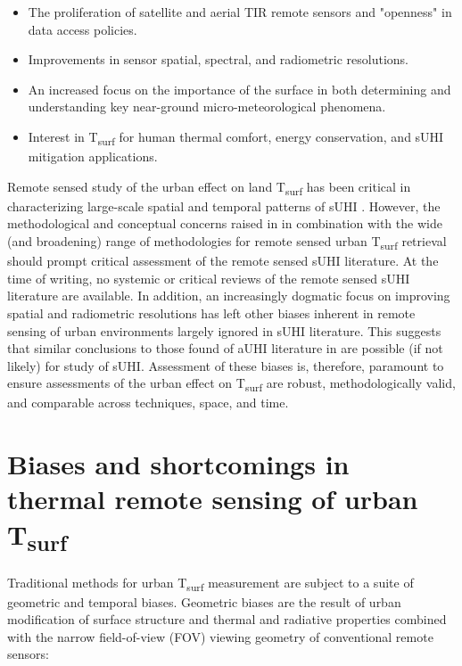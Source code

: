 \begin{bibunit}
\begin{itemize}
	\item The proliferation of satellite and aerial TIR remote sensors and "openness" in data access policies.
	\item Improvements in sensor spatial, spectral, and radiometric resolutions. 
	\item An increased focus on the importance of the surface in both determining and understanding key near-ground micro-meteorological phenomena.
	\item Interest in T\textsubscript{surf} for human thermal comfort, energy conservation, and sUHI mitigation applications. 
\end{itemize}

Remote sensed study of the urban effect on land T\textsubscript{surf} has been critical in characterizing large-scale spatial and temporal patterns of sUHI \citep{Peng2012, Streutker2003, Imhoff2010}. However, the methodological and conceptual concerns raised in \citet{Stewart2011} in combination with the wide (and broadening) range of methodologies for remote sensed urban T\textsubscript{surf} retrieval should prompt critical assessment of the remote sensed sUHI literature. At the time of writing, no systemic or critical reviews of the remote sensed sUHI literature are available. In addition, an increasingly dogmatic focus on improving spatial and radiometric resolutions has left other biases inherent in remote sensing of urban environments largely ignored in sUHI literature. This suggests that similar conclusions to those found of aUHI literature in \citet{Stewart2011} are possible (if not likely) for study of sUHI. Assessment of these biases is, therefore, paramount to ensure assessments of the urban effect on T\textsubscript{surf} are robust, methodologically valid, and comparable across techniques, space, and time.

\section{Biases and shortcomings in thermal remote sensing of urban T\textsubscript{surf}}

Traditional methods for urban T\textsubscript{surf} measurement are subject to a suite of geometric and temporal biases. Geometric biases are the result of urban modification of surface structure and thermal and radiative properties combined with the  narrow field-of-view (FOV) viewing geometry of conventional remote sensors:


\end{bibunit}

